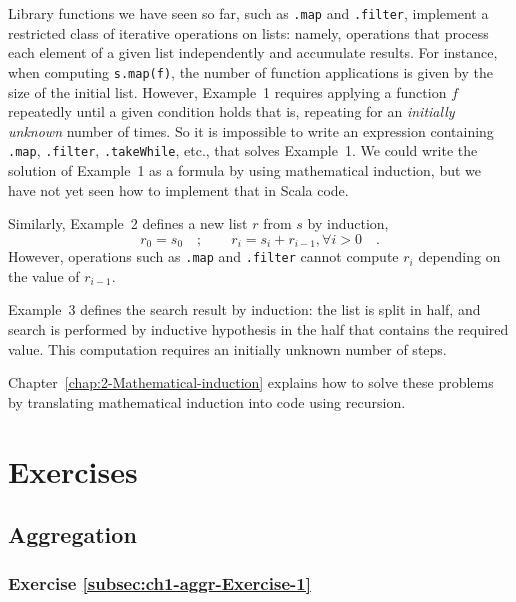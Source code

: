 Library functions we have seen so far, such as \texttt{}\lstinline!.map!
and \lstinline!.filter!, implement a restricted class of iterative
operations on lists: namely, operations that process each element
of a given list independently and accumulate results. For instance,
when computing \lstinline!s.map(f)!, the number of function applications
is given by the size of the initial list. However, Example\ 1 requires
applying a function $f$ repeatedly until a given condition holds
\textendash{} that is, repeating for an \emph{initially unknown} number
of times. So it is impossible to write an expression containing \lstinline!.map!,
\lstinline!.filter!, \lstinline!.takeWhile!, etc., that solves Example\ 1.
We could write the solution of Example\ 1 as a formula by using mathematical
induction, but we have not yet seen how to implement that in Scala
code. 

Similarly, Example\ 2 defines a new list $r$ from $s$ by induction,
\[
r_{0}=s_{0}\quad;\quad\quad r_{i}=s_{i}+r_{i-1},\forall i>0\quad.
\]
However, operations such as \texttt{}\lstinline!.map! and \texttt{}\lstinline!.filter!
cannot compute $r_{i}$ depending on the value of $r_{i-1}$.

Example\ 3 defines the search result by induction: the list is split
in half, and search is performed by inductive hypothesis in the half
that contains the required value. This computation requires an initially
unknown number of steps.

Chapter\ \ref{chap:2-Mathematical-induction} explains how to solve
these problems by translating mathematical induction into code using
recursion.

\section{Exercises\label{sec:Chapter-1-Exercises}}

\subsection{Aggregation}

\subsubsection{Exercise \label{subsec:ch1-aggr-Exercise-1}\ref{subsec:ch1-aggr-Exercise-1}}

